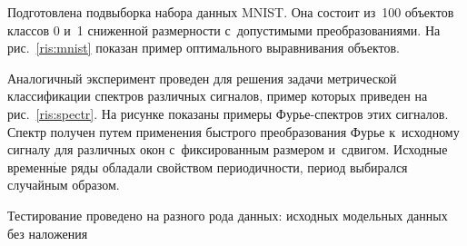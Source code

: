 \begin{multicols}{2}
Подготовлена подвыборка набора данных MNIST. Она 
состоит из~100 объектов классов 0 и~1 сниженной размерности
 с~допустимыми преобразованиями. На рис.~\ref{ris:mnist} 
 показан пример оптимального выравнивания объектов.


Аналогичный эксперимент проведен для решения задачи метрической 
классификации спектров различных сигналов, пример которых приведен на 
рис.~\ref{ris:spectr}. На рисунке показаны примеры Фурье-спект\-ров 
этих сигналов. Спектр получен путем применения быстрого преобразования 
Фурье к~исходному сигналу для различных окон с~фиксированным размером и~сдвигом. 
Исходные временн$\acute{\mbox{ы}}$е ряды обладали свойством периодичности, период выбирался 
случайным образом.



Тестирование проведено на разного рода данных: исходных 
модельных данных без наложения\linebreak\vspace*{-12pt}

\pagebreak

\end{multicols}

\begin{figure*} %
\vspace*{1pt}
    \begin{center}  
  \mbox{%
 \epsfxsize=149.062mm 
 }
\end{center}
\vspace*{-8pt}
\vspace*{9pt}
\end{figure*}

